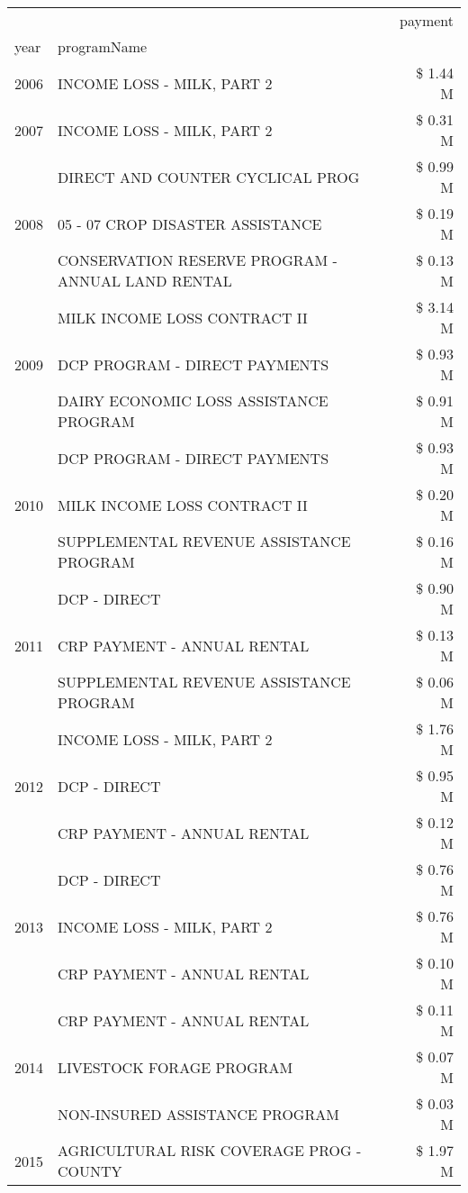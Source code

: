 \begin{tabular}{llr}
\toprule
 &  & payment \\
year & programName &  \\
\midrule
2006 & INCOME LOSS - MILK, PART 2 & \$ 1.44 M \\
\cline{1-3}
2007 & INCOME LOSS - MILK, PART 2 & \$ 0.31 M \\
\cline{1-3}
\multirow[t]{3}{*}{2008} & DIRECT AND COUNTER CYCLICAL PROG & \$ 0.99 M \\
 & 05 - 07 CROP DISASTER ASSISTANCE & \$ 0.19 M \\
 & CONSERVATION RESERVE PROGRAM - ANNUAL LAND RENTAL & \$ 0.13 M \\
\cline{1-3}
\multirow[t]{3}{*}{2009} & MILK INCOME LOSS CONTRACT II & \$ 3.14 M \\
 & DCP PROGRAM - DIRECT PAYMENTS & \$ 0.93 M \\
 & DAIRY ECONOMIC LOSS ASSISTANCE PROGRAM & \$ 0.91 M \\
\cline{1-3}
\multirow[t]{3}{*}{2010} & DCP PROGRAM - DIRECT PAYMENTS & \$ 0.93 M \\
 & MILK INCOME LOSS CONTRACT II & \$ 0.20 M \\
 & SUPPLEMENTAL REVENUE ASSISTANCE PROGRAM & \$ 0.16 M \\
\cline{1-3}
\multirow[t]{3}{*}{2011} & DCP - DIRECT & \$ 0.90 M \\
 & CRP PAYMENT - ANNUAL RENTAL & \$ 0.13 M \\
 & SUPPLEMENTAL REVENUE ASSISTANCE PROGRAM & \$ 0.06 M \\
\cline{1-3}
\multirow[t]{3}{*}{2012} & INCOME LOSS - MILK, PART 2 & \$ 1.76 M \\
 & DCP - DIRECT & \$ 0.95 M \\
 & CRP PAYMENT - ANNUAL RENTAL & \$ 0.12 M \\
\cline{1-3}
\multirow[t]{3}{*}{2013} & DCP - DIRECT & \$ 0.76 M \\
 & INCOME LOSS - MILK, PART 2 & \$ 0.76 M \\
 & CRP PAYMENT - ANNUAL RENTAL & \$ 0.10 M \\
\cline{1-3}
\multirow[t]{3}{*}{2014} & CRP PAYMENT - ANNUAL RENTAL & \$ 0.11 M \\
 & LIVESTOCK FORAGE PROGRAM & \$ 0.07 M \\
 & NON-INSURED ASSISTANCE PROGRAM & \$ 0.03 M \\
\cline{1-3}
\multirow[t]{3}{*}{2015} & AGRICULTURAL RISK COVERAGE PROG - COUNTY & \$ 1.97 M \\

\end{tabular}
